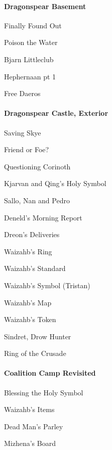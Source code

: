 \documentclass[10pt,a4,twoside]{book}
\begin{document}
\begin{multicols}{3}
\paragraph*{Dragonspear Basement}
\begin{trivlist}
\item Finally Found Out
\item Poison the Water %
\item Bjarn Littleclub
\item Hephernaan pt 1
\item Free Daeros %
\end{trivlist}

\paragraph*{Dragonspear Castle, Exterior}
\begin{trivlist}
\item Saving Skye %
\item Friend or Foe?
\item Questioning Corinoth
\item Kjarvan and Qing's Holy Symbol %
\item Sallo, Nan and Pedro
\item Deneld's Morning Report
\item Dreon's Deliveries
\item Waizahb's Ring
\item Waizahb's Standard
\item Waizahb's Symbol (Tristan)
\item Waizahb's Map
\item Waizahb's Token
\item Sindret, Drow Hunter
\item Ring of the Crusade
\end{trivlist}

\paragraph*{Coalition Camp Revisited}
\begin{trivlist}
\item Blessing the Holy Symbol %
\item Waizahb's Items
\item Dead Man's Parley
\item Mizhena's Board
\end{trivlist}


\end{multicols}
\end{document}

